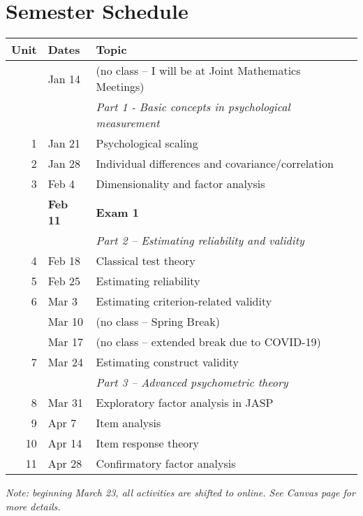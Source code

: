 \documentclass[10pt]{article}
\begin{document}
\section*{Semester Schedule}
\label{sec:orgf7eff86}
\begin{center}
\begin{tabular}{rll}
Unit & Dates & Topic\\
\hline
 & Jan 14 & (no class -- I will be at Joint Mathematics Meetings)\\
 &  & \emph{Part 1 - Basic concepts in psychological measurement}\\
1 & Jan 21 & Psychological scaling\\
2 & Jan 28 & Individual differences and covariance/correlation\\
3 & Feb 4 & Dimensionality and factor analysis\\
 & \textbf{Feb 11} & \textbf{Exam 1}\\
\hline
 &  & \emph{Part 2 -- Estimating reliability and validity}\\
4 & Feb 18 & Classical test theory\\
5 & Feb 25 & Estimating reliability\\
6 & Mar 3 & Estimating criterion-related validity\\
 & Mar 10 & (no class -- Spring Break)\\
 & Mar 17 & (no class -- extended break due to COVID-19)\\
7 & Mar 24 & Estimating construct validity\\
\hline
 &  & \emph{Part 3 -- Advanced psychometric theory}\\
8 & Mar 31 & Exploratory factor analysis in JASP\\
9 & Apr 7 & Item analysis\\
10 & Apr 14 & Item response theory\\
11 & Apr 28 & Confirmatory factor analysis\\
\hline
\end{tabular}
\end{center}

\emph{Note: beginning March 23, all activities are shifted to online. See Canvas page for more details.}
\end{document}
